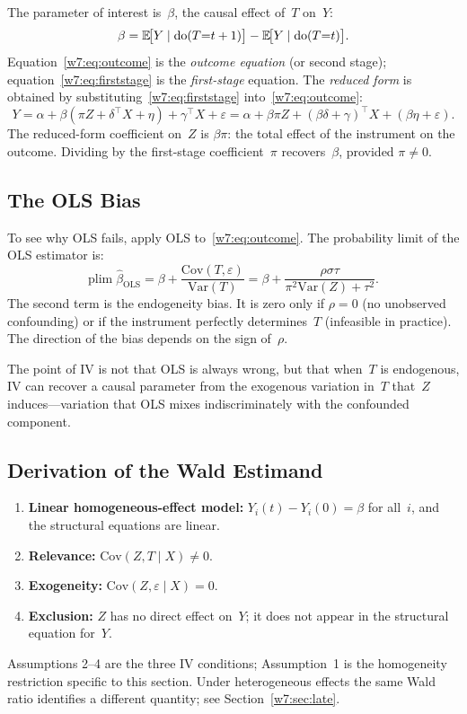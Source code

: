 \documentclass[master.tex]{subfiles}
\begin{document}
The parameter of interest is~$\beta$, the causal effect of~$T$
on~$Y$:
\[
  \beta = \mathbb{E}\!\bigl[Y \mid \mathrm{do}(T{=}t+1)\bigr]
        - \mathbb{E}\!\bigl[Y \mid \mathrm{do}(T{=}t)\bigr].
\]
Equation~\eqref{w7:eq:outcome} is the \emph{outcome equation} (or
second stage); equation~\eqref{w7:eq:firststage} is the
\emph{first-stage} equation.  The \emph{reduced form} is obtained by
substituting~\eqref{w7:eq:firststage} into~\eqref{w7:eq:outcome}:
\[
  Y = \alpha + \beta(\pi Z + \delta^\top X + \eta)
    + \gamma^\top X + \varepsilon
  = \alpha + \beta\pi Z + (\beta\delta + \gamma)^\top X
    + (\beta\eta + \varepsilon).
\]
The reduced-form coefficient on~$Z$ is $\beta\pi$: the total
effect of the instrument on the outcome.  Dividing by the
first-stage coefficient~$\pi$ recovers~$\beta$, provided
$\pi \neq 0$.

\subsection{The OLS Bias}

To see why OLS fails, apply OLS to~\eqref{w7:eq:outcome}.  The
probability limit of the OLS estimator is:
\[
  \mathrm{plim}\; \hat\beta_{\mathrm{OLS}}
  = \beta + \frac{\mathrm{Cov}(T, \varepsilon)}{\mathrm{Var}(T)}
  = \beta + \frac{\rho\sigma\tau}{\pi^2 \mathrm{Var}(Z) + \tau^2}.
\]
The second term is the endogeneity bias.  It is zero only if
$\rho = 0$ (no unobserved confounding) or if the instrument
perfectly determines~$T$ (infeasible in practice).  The direction
of the bias depends on the sign of~$\rho$.

The point of IV is not that OLS is always wrong, but that when~$T$
is endogenous, IV can recover a causal parameter from the exogenous
variation in~$T$ that~$Z$ induces---variation that OLS mixes
indiscriminately with the confounded component.

\subsection{Derivation of the Wald Estimand}

\begin{tcolorbox}[warnstyle, title={Assumptions Active in This Derivation}]
\begin{enumerate}
  \item \textbf{Linear homogeneous-effect model:} $Y_i(t) - Y_i(0)
    = \beta$ for all~$i$, and the structural equations are linear.
  \item \textbf{Relevance:} $\mathrm{Cov}(Z, T \mid X) \neq 0$.
  \item \textbf{Exogeneity:} $\mathrm{Cov}(Z, \varepsilon \mid X)
    = 0$.
  \item \textbf{Exclusion:} $Z$ has no direct effect on~$Y$; it
    does not appear in the structural equation for~$Y$.
\end{enumerate}
Assumptions 2--4 are the three IV conditions; Assumption~1 is the
homogeneity restriction specific to this section.  Under
heterogeneous effects the same Wald ratio identifies a different
quantity; see Section~\ref{w7:sec:late}.
\end{tcolorbox}
\end{document}

